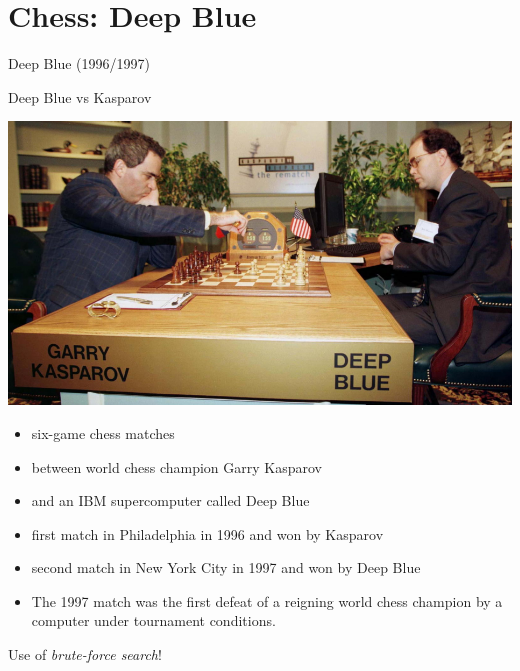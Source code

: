\documentclass{beamer}
\newcommand{\colorcite}{\color{gray!35}}
\begin{document}

  \section{Chess: Deep Blue}

  \begin{frame}[standout]
    \begin{center}
      Deep Blue (1996/1997)
    \end{center}
  \end{frame}

  {
    \begin{frame}{Deep Blue vs Kasparov}
      \begin{center}
        \includegraphics[height=.5\textheight, width=\textwidth, keepaspectratio]{../img/DeepBlue.png}
      \end{center}
      \pause
      \begin{itemize}[<+- | alert@+>]
          \tiny
        \item six-game chess matches
        \item between world chess champion Garry Kasparov
        \item and an IBM supercomputer called Deep Blue
        \item first match in Philadelphia in 1996 and won by Kasparov
        \item second match in New York City in 1997 and won by Deep Blue
        \item The 1997 match was the first defeat of a reigning world chess champion by a computer under tournament conditions.
      \end{itemize}
      \pause
      Use of \emph{brute-force search}!
    \end{frame}
  }
\end{document}
